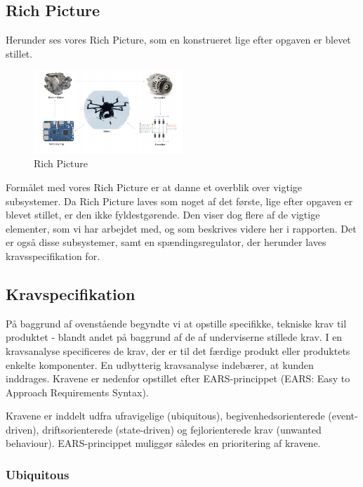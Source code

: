 \subsection{Rich Picture}
\label{sec:rich-picture-}

Herunder ses vores Rich Picture, som en konstrueret lige efter opgaven er blevet stillet.

\begin{figure}[h]
  \centering
  \includegraphics[width=0.5\textwidth]{./figurer/int1.png}
  \caption{Rich Picture}
  \label{fig:int1}
\end{figure}

Formålet med vores Rich Picture er at danne et overblik over vigtige subsystemer. Da Rich Picture laves som noget af det første, lige efter opgaven er blevet stillet, er den ikke fyldestgørende. Den viser dog flere af de vigtige elementer, som vi har arbejdet med, og som beskrives videre her i rapporten. Det er også disse subsystemer, samt en spændingsregulator, der herunder laves kravsspecifikation for.

\subsection{Kravspecifikation}
\label{sec:kravspecifikation}

På baggrund af ovenstående begyndte vi at opstille specifikke, tekniske krav til produktet - blandt andet på baggrund af de af underviserne stillede krav. I en kravsanalyse specificeres de krav, der er til det færdige produkt eller produktets enkelte komponenter. En udbytterig kravsanalyse indebærer, at kunden inddrages. Kravene er nedenfor opstillet efter EARS-princippet (EARS: Easy to Approach Requirements Syntax).

Kravene er inddelt udfra ufravigelige (ubiquitous), begivenhedsorienterede (event-driven), driftsorienterede (state-driven) og fejlorienterede krav (unwanted behaviour). EARS-princippet muliggør således en prioritering af kravene.

\subsubsection{Ubiquitous}
\label{sec:kravspecifikation-1}

